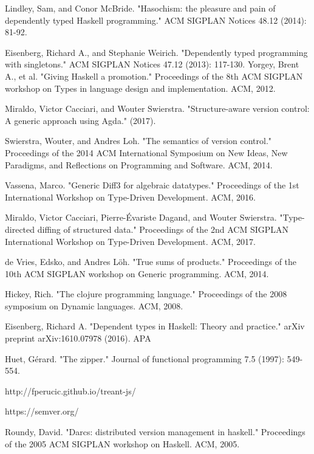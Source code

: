 \documentclass[11pt, titlepage]{article}
\begin{document}
\begin{thebibliography}{20}  
  Lindley, Sam, and Conor McBride. "Hasochism: the pleasure and pain of dependently typed Haskell programming." ACM SIGPLAN Notices 48.12 (2014): 81-92.

  Eisenberg, Richard A., and Stephanie Weirich. "Dependently typed programming with singletons." ACM SIGPLAN Notices 47.12 (2013): 117-130.
  Yorgey, Brent A., et al. "Giving Haskell a promotion." Proceedings of the 8th ACM SIGPLAN workshop on Types in language design and implementation. ACM, 2012.
  
   Miraldo, Victor Cacciari, and Wouter Swierstra. "Structure-aware version control: A generic approach using Agda." (2017).

   Swierstra, Wouter, and Andres Loh. "The semantics of version control." Proceedings of the 2014 ACM International Symposium on New Ideas, New Paradigms, and Reflections on Programming and Software. ACM, 2014.
  
  Vassena, Marco. "Generic Diff3 for algebraic datatypes." Proceedings of the 1st International Workshop on Type-Driven Development. ACM, 2016.

  Miraldo, Victor Cacciari, Pierre-Évariste Dagand, and Wouter Swierstra. "Type-directed diffing of structured data." Proceedings of the 2nd ACM SIGPLAN International Workshop on Type-Driven Development. ACM, 2017.
  
  de Vries, Edsko, and Andres Löh. "True sums of products." Proceedings of the 10th ACM SIGPLAN workshop on Generic programming. ACM, 2014.
  
Hickey, Rich. "The clojure programming language." Proceedings of the 2008 symposium on Dynamic languages. ACM, 2008.

 Eisenberg, Richard A. "Dependent types in Haskell: Theory and practice." arXiv preprint arXiv:1610.07978 (2016). APA	

 Huet, Gérard. "The zipper." Journal of functional programming 7.5 (1997): 549-554.

 http://fperucic.github.io/treant-js/

 https://semver.org/

 Roundy, David. "Darcs: distributed version management in haskell." Proceedings of the 2005 ACM SIGPLAN workshop on Haskell. ACM, 2005.

\end{thebibliography}
\end{document}
